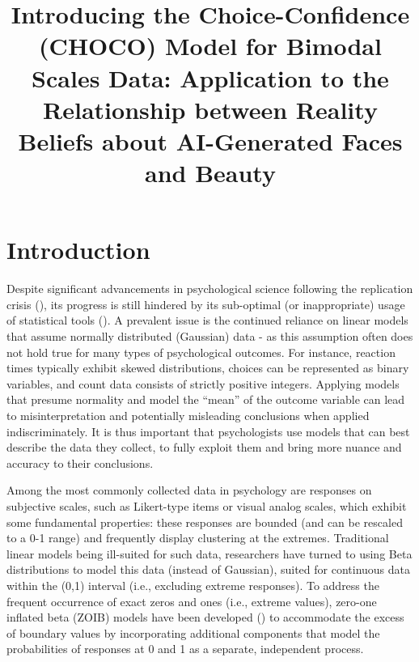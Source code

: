 \documentclass[
  jou,
  floatsintext,
  longtable,
  nolmodern,
  notxfonts,
  notimes,
  colorlinks=true,linkcolor=blue,citecolor=blue,urlcolor=blue]{apa7}
\title{\textbf{Introducing the Choice-Confidence (CHOCO) Model for
Bimodal Scales Data: Application to the Relationship between Reality
Beliefs about AI-Generated Faces and Beauty}}
\begin{document}
\maketitle


\setcounter{secnumdepth}{-\maxdimen} %

\setlength\LTleft{0pt}


\section{Introduction}\label{introduction}

Despite significant advancements in psychological science following the
replication crisis (), its progress is still hindered by its sub-optimal (or
inappropriate) usage of statistical tools
(). A prevalent
issue is the continued reliance on linear models that assume normally
distributed (Gaussian) data - as this assumption often does not hold
true for many types of psychological outcomes. For instance, reaction
times typically exhibit skewed distributions, choices can be represented
as binary variables, and count data consists of strictly positive
integers. Applying models that presume normality and model the ``mean''
of the outcome variable can lead to misinterpretation and potentially
misleading conclusions when applied indiscriminately. It is thus
important that psychologists use models that can best describe the data
they collect, to fully exploit them and bring more nuance and accuracy
to their conclusions.

Among the most commonly collected data in psychology are responses on
subjective scales, such as Likert-type items or visual analog scales,
which exhibit some fundamental properties: these responses are bounded
(and can be rescaled to a 0-1 range) and frequently display clustering
at the extremes. Traditional linear models being ill-suited for such
data, researchers have turned to using Beta distributions to model this
data (instead of Gaussian), suited for continuous data within the (0,1)
interval (i.e., excluding extreme responses). To address the frequent
occurrence of exact zeros and ones (i.e., extreme values), zero-one
inflated beta (ZOIB) models have been developed
() to
accommodate the excess of boundary values by incorporating additional
components that model the probabilities of responses at 0 and 1 as a
separate, independent process.
\end{document}
